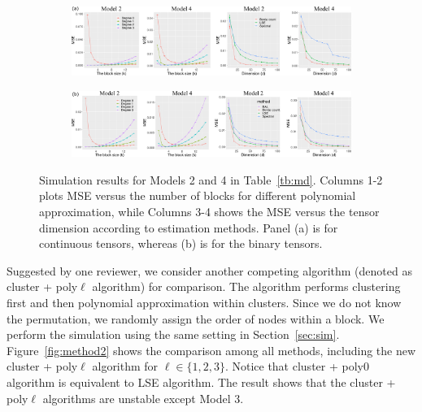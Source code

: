 \documentclass[12pt]{article}
\theoremstyle{definition}
\begin{document}
\begin{figure}[htp!]
    \centering
    \begin{subfigure}[b]{\textwidth}
    \includegraphics[width = \textwidth]{figure/extra_conti.pdf}  
        \vspace{0cm}
    \end{subfigure}
    \begin{subfigure}[b]{\textwidth}
    \includegraphics[width = \textwidth]{figure/extra_binary.pdf}    
    \end{subfigure}
    \caption{Simulation results for Models 2 and 4 in Table~\ref{tb:md}. Columns 1-2 plots MSE versus the number of blocks for different polynomial approximation, while Columns 3-4 shows the MSE versus the tensor dimension according to estimation methods. Panel (a) is for continuous tensors, whereas (b) is for the binary tensors.}
    \label{fig:extrasim1}
\end{figure}



Suggested by one reviewer, we consider another competing algorithm (denoted as cluster + poly$\ell$ algorithm) for comparison. The algorithm performs clustering first and then polynomial approximation within clusters. Since we do not know the permutation, we randomly assign the order of nodes within a block. We perform the simulation using the same setting in Section~\ref{sec:sim}. 
Figure~\ref{fig:method2} shows the comparison among all methods, including the new cluster + poly$\ell$ algorithm for $\ell\in\{1,2,3\}$. Notice that cluster + poly0 algorithm is equivalent to LSE algorithm. The result shows that the cluster + poly$\ell$ algorithms are unstable except Model 3. 
\end{document}

